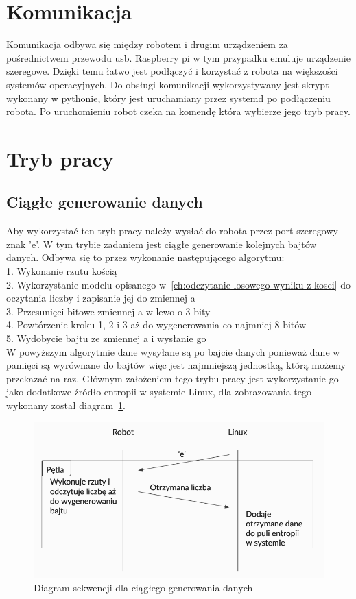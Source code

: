 \section{Komunikacja} %

Komunikacja odbywa się między robotem i drugim urządzeniem za pośrednictwem przewodu usb.
Raspberry pi w tym przypadku emuluje urządzenie szeregowe.
Dzięki temu łatwo jest podłączyć i korzystać z robota na większości systemów operacyjnych. 
Do obsługi komunikacji wykorzystywany jest skrypt wykonany w pythonie, który jest uruchamiany 
przez systemd po podłączeniu robota. Po uruchomieniu robot czeka na komendę która wybierze jego tryb pracy. 

\section{Tryb pracy} 

\subsection{Ciągłe generowanie danych}
Aby wykorzystać ten tryb pracy należy wysłać do robota przez port szeregowy znak 'e'.
W tym trybie zadaniem jest ciągłe generowanie kolejnych bajtów danych.
Odbywa się to przez wykonanie następującego algorytmu:\\
1. Wykonanie rzutu kością \\
2. Wykorzystanie modelu opisanego w~\ref{ch:odczytanie-losowego-wyniku-z-kosci} do oczytania liczby i zapisanie jej do zmiennej a \\
3. Przesunięci bitowe zmiennej a w lewo o 3 bity \\
4. Powtórzenie kroku 1, 2 i 3 aż do wygenerowania co najmniej 8 bitów \\
5. Wydobycie bajtu ze zmiennej a i wysłanie go \\

W powyższym algorytmie dane wysyłane są po bajcie danych ponieważ dane w pamięci 
są wyrównane do bajtów więc jest najmniejszą jednostką, którą możemy przekazać na raz.
Głównym założeniem tego trybu pracy jest wykorzystanie go jako dodatkowe źródło entropii w systemie Linux, 
dla zobrazowania tego wykonany został diagram~\ref{fig:interface_a}.

\begin{figure}[H]
    \centering
    \includegraphics[width=0.5\linewidth]{chapters/05-Przetwarzanie Wyniku/figures/InterfaceA}
    \caption{Diagram sekwencji dla ciągłego generowania danych}
    \label{fig:interface_a}
\end{figure}

